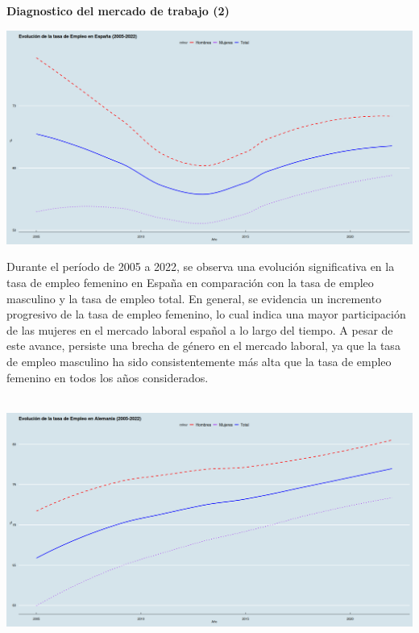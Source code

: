 \textbf{Diagnostico del mercado de trabajo (2)}

    \begin{center}
	\includegraphics[scale=.32]{image/b3ej3e.png}
    \end{center}
    \vspace{.5cm}
    Durante el período de 2005 a 2022, se observa una evolución significativa en la tasa de empleo femenino en España en comparación con la tasa de empleo masculino y la tasa de empleo total. En general, se evidencia un incremento progresivo de la tasa de empleo femenino, lo cual indica una mayor participación de las mujeres en el mercado laboral español a lo largo del tiempo. A pesar de este avance, persiste una brecha de género en el mercado laboral, ya que la tasa de empleo masculino ha sido consistentemente más alta que la tasa de empleo femenino en todos los años considerados.\\\\

    \begin{center}
	\includegraphics[scale=.32]{image/b3ej3a.png}
    \end{center}
    \vspace{.5cm}

